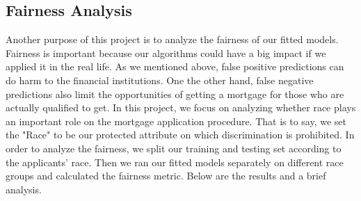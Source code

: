\documentclass[letterpaper, 10 pt, conference]{ieeeconf}  %
\begin{document}
\subsection{Fairness Analysis}
Another purpose of this project is to analyze the fairness of our fitted models. Fairness is important because our algorithms could have a big impact if we applied it in the real life. As we mentioned above, false positive predictions can do harm to the financial institutions. One the other hand, false negative predictions also limit the opportunities of getting a mortgage for those who are actually qualified to get. In this project, we focus on analyzing whether race plays an important role on the mortgage application procedure. That is to say, we set the "Race" to be our protected attribute on which discrimination is prohibited.
In order to analyze the fairness, we split our training and testing set according to the applicants' race. Then we ran our fitted models separately on different race groups and calculated the fairness metric. Below are the results and a brief analysis.
\end{document}
